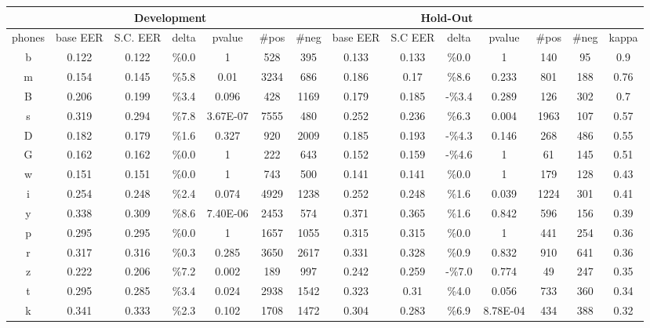 \begin{table}[H]
\tiny{
\centering
\renewcommand{\arraystretch}{2}

\begin{tabular}{|c| |c|c|c|c|c|c| |c|c|c|c|c|c| |c|}
\hline
& \multicolumn{5}{c}{Development} & & \multicolumn{5}{c}{Hold-Out} & &  \\ \hline
phones & base EER & S.C. EER & delta & pvalue & \#pos & \#neg & base EER & S.C EER & delta & pvalue & \#pos &  \#neg & kappa \\ \hline
b & 0.122 & 0.122 & \%0.0 & 1 & 528 & 395 & 0.133 & 0.133 & \%0.0 & 1 & 140 & 95 & 0.9 \\ \hline
\rowcolor{lightgray} m & 0.154 & 0.145 & \%5.8 & 0.01 & 3234 & 686 & 0.186 & 0.17 & \%8.6 & 0.233 & 801 & 188 & 0.76 \\ \hline
B & 0.206 & 0.199 & \%3.4 & 0.096 & 428 & 1169 & 0.179 & 0.185 & -\%3.4 & 0.289 & 126 & 302 & 0.7 \\ \hline
\rowcolor{lightgray} s & 0.319 & 0.294 & \%7.8 & 3.67E-07 & 7555 & 480 & 0.252 & 0.236 & \%6.3 & 0.004 & 1963 & 107 & 0.57 \\ \hline
D & 0.182 & 0.179 & \%1.6 & 0.327 & 920 & 2009 & 0.185 & 0.193 & -\%4.3 & 0.146 & 268 & 486 & 0.55 \\ \hline
G & 0.162 & 0.162 & \%0.0 & 1 & 222 & 643 & 0.152 & 0.159 & -\%4.6 & 1 & 61 & 145 & 0.51 \\ \hline
w & 0.151 & 0.151 & \%0.0 & 1 & 743 & 500 & 0.141 & 0.141 & \%0.0 & 1 & 179 & 128 & 0.43 \\ \hline
i & 0.254 & 0.248 & \%2.4 & 0.074 & 4929 & 1238 & 0.252 & 0.248 & \%1.6 & 0.039 & 1224 & 301 & 0.41 \\ \hline
\rowcolor{lightgray} y & 0.338 & 0.309 & \%8.6 & 7.40E-06 & 2453 & 574 & 0.371 & 0.365 & \%1.6 & 0.842 & 596 & 156 & 0.39 \\ \hline
p & 0.295 & 0.295 & \%0.0 & 1 & 1657 & 1055 & 0.315 & 0.315 & \%0.0 & 1 & 441 & 254 & 0.36 \\ \hline
r & 0.317 & 0.316 & \%0.3 & 0.285 & 3650 & 2617 & 0.331 & 0.328 & \%0.9 & 0.832 & 910 & 641 & 0.36 \\ \hline
\rowcolor{lightgray} z & 0.222 & 0.206 & \%7.2 & 0.002 & 189 & 997 & 0.242 & 0.259 & -\%7.0 & 0.774 & 49 & 247 & 0.35 \\ \hline
\rowcolor{lightgray} t & 0.295 & 0.285 & \%3.4 & 0.024 & 2938 & 1542 & 0.323 & 0.31 & \%4.0 & 0.056 & 733 & 360 & 0.34 \\ \hline
k & 0.341 & 0.333 & \%2.3 & 0.102 & 1708 & 1472 & 0.304 & 0.283 & \%6.9 & 8.78E-04 & 434 & 388 & 0.32 \\ \hline

\end{tabular}}
\end{table}
